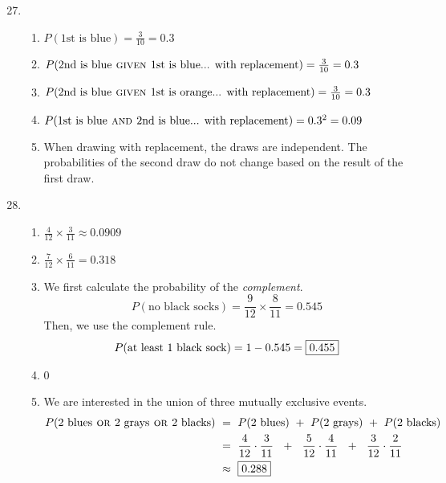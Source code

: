 \documentclass[12pt,letterpaper]{article}
\begin{document}
\newcommand{\AND}{\textsc{~and~}}
\newcommand{\OR}{\textsc{~or~}}
\newcommand{\GIVEN}{\textsc{~given~}}

\begin{enumerate}
\setcounter{enumi}{26}
\item\begin{enumerate}
\item $P(\text{1st is blue})=\frac{3}{10} = 0.3$
\item $P(\text{2nd is blue}\GIVEN \text{1st is blue... with replacement} )=\frac{3}{10} = 0.3$
\item $P(\text{2nd is blue}\GIVEN \text{1st is orange... with replacement} )=\frac{3}{10} = 0.3$
\item $P(\text{1st is blue} \AND \text{2nd is blue... with replacement} )= 0.3^2 = 0.09$
\item When drawing with replacement, the draws are independent. The probabilities of the second draw do not change based on the result of the first draw.
\end{enumerate}

\item \begin{enumerate}
\item $\frac{4}{12} \times \frac{3}{11} \approx 0.0909 $
\item $\frac{7}{12} \times \frac{6}{11} = 0.318 $
\item We first calculate the probability of the \emph{complement}.
$$P(\text{no black socks}) = \frac{9}{12}\times\frac{8}{11} = 0.545 $$
Then, we use the complement rule. 
$$P(\text{at least 1 black sock}) = 1-0.545 = \fbox{0.455} $$
\item 0
\item We are interested in the union of three mutually exclusive events.
\begin{align*}
P(\text{2 blues} \OR \text{2 grays} \OR \text{2 blacks}) 
 ~ &=~ P(\text{2 blues}) ~+~ P(\text{2 grays}) ~+~ P(\text{2 blacks}) \\
  &=~ \frac{4}{12}\cdot\frac{3}{11} ~~+~~ \frac{5}{12}\cdot\frac{4}{11} ~~+~~ \frac{3}{12}\cdot\frac{2}{11} \\
  &\approx~ \fbox{0.288}
\end{align*}
\end{enumerate}


\end{enumerate}
\end{document}
